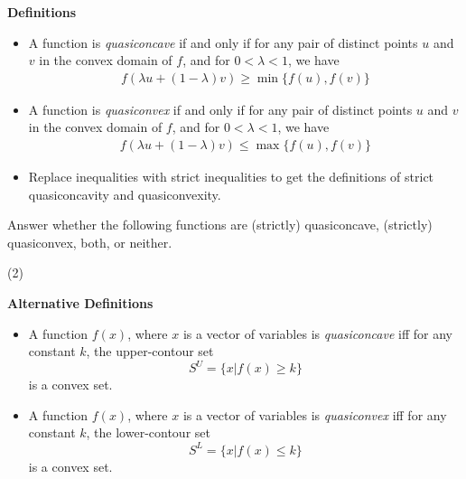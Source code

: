 \documentclass{./../../Latex/handout}
\begin{document}
\thispagestyle{plain}

\textbf{Definitions}
\begin{itemize}
\item A function is \textit{quasiconcave} if and only if for any pair of distinct points $u$ and $v$ in the convex domain of $f$, and for $0<\lambda<1$, we have
$$
\begin{array}{r}
f(\lambda u+(1-\lambda) v) \geq \min \{f(u), f(v)\} 
\end{array}
$$
  \item A function is \textit{quasiconvex} if and only if for any pair of distinct points $u$ and $v$ in the convex domain of $f$, and for $0<\lambda<1$, we have
$$
\begin{array}{r}
f(\lambda u+(1-\lambda) v) \leq \max \{f(u), f(v)\} 
\end{array}
$$
\item Replace inequalities with strict inequalities to get the definitions of strict quasiconcavity and quasiconvexity. 
\end{itemize}

Answer whether the following functions are (strictly) quasiconcave, (strictly) quasiconvex, both, or neither.

\begin{tasks}(2)
\task 
{}	
\task 
{}	
\end{tasks}

\newpage
\textbf{Alternative Definitions}
\begin{itemize}
  \item A function $f(x)$, where $x$ is a vector of variables is \textit{quasiconcave} iff for any constant $k$, the upper-contour set
$$ S^U = \{x | f(x) \geq k \} $$
is a convex set. 
\item A function $f(x)$, where $x$ is a vector of variables is \textit{quasiconvex} iff for any constant $k$, the lower-contour set
$$ S^L = \{x | f(x) \leq k \} $$
is a convex set.
\end{itemize}
\end{document}
